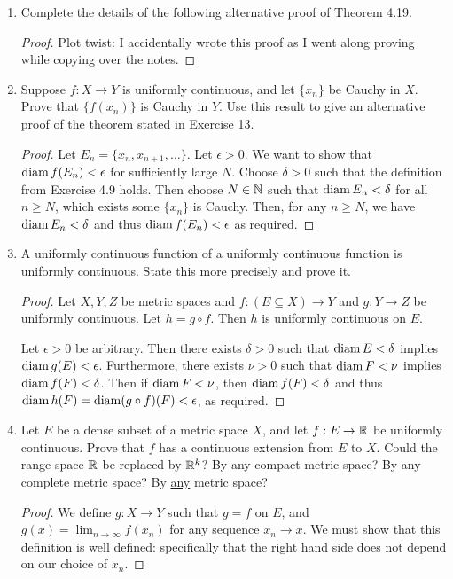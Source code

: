 \begin{enumerate}
\item %
Complete the details of the following alternative proof of Theorem 4.19.
\begin{proof}
Plot twist: I accidentally wrote this proof as I went along proving while copying over the notes.
\end{proof}

\item %
Suppose $f: X \to Y$ is uniformly continuous, and let $\{x_n\}$ be Cauchy in $X$. Prove that $\{f(x_n)\}$ is Cauchy in $Y$. Use this result to give an alternative proof of the theorem stated in Exercise 13.

\begin{proof}
    Let $E_n = \{x_n, x_{n+1}, \dotsc\}$. Let $\epsilon > 0$. We want to show that $\operatorname{diam} f(E_n) < \epsilon$ for sufficiently large $N$. Choose $\delta > 0$ such that the definition from Exercise 4.9 holds. Then choose $N \in \mathbb{N}$ such that $\operatorname{diam} E_n < \delta$ for all $n \ge N$, which exists some $\{x_n\}$ is Cauchy. Then, for any $n \ge N$, we have $\operatorname{diam} E_n < \delta$ and thus $\operatorname{diam} f(E_n) < \epsilon$ as required.
\end{proof}

\item %
A uniformly continuous function of a uniformly continuous function is uniformly continuous. State this more precisely and prove it.
\begin{proof}
Let $X, Y, Z$ be metric spaces and $f: (E \subseteq X) \to Y$ and $g: Y \to Z$ be uniformly continuous. Let $h = g \circ f$. Then $h$ is uniformly continuous on $E$.

Let $\epsilon > 0$ be arbitrary. Then there exists $\delta > 0$ such that $\operatorname{diam} E < \delta$ implies $\operatorname{diam} g(E) < \epsilon$. Furthermore, there exists $\nu > 0$ such that $\operatorname{diam} F < \nu$ implies $\operatorname{diam} f(F) < \delta$. Then if $\operatorname{diam} F < \nu$, then $\operatorname{diam} f(F) < \delta$ and thus $\operatorname{diam} h(F) = \operatorname{diam} (g \circ f)(F) < \epsilon$, as required.
\end{proof}

\item %
Let $E$ be a dense subset of a metric space $X$, and let $f: E \rightarrow \mathbb{R}$ be uniformly continuous. Prove that $f$ has a continuous extension from $E$ to $X$. Could the range space $\mathbb{R}$ be replaced by $\mathbb{R}^k$? By any compact metric space? By any complete metric space? By \underline{any} metric space?

\begin{proof}
We define $g: X \to Y$ such that $g = f$ on $E$, and $g(x) = \lim_{n \to \infty} f(x_n)$ for any sequence $x_n \to x$. We must show that this definition is well defined: specifically that the right hand side does not depend on our choice of $x_n$. 


\end{proof}
\end{enumerate}
